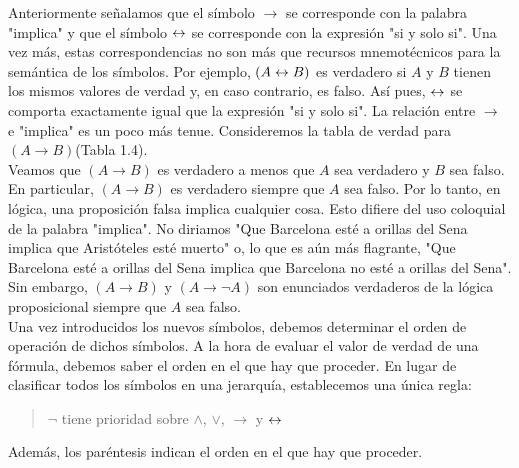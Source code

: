 \documentclass[12pt,a4paper]{book}
\newcommand{\comillas}[1]{"#1"}
\begin{document}
    Anteriormente señalamos que el símbolo $\rightarrow$ se corresponde con la palabra \comillas{implica} y que el símbolo $\leftrightarrow$ se corresponde con la
    expresión \comillas{si y solo si}. Una vez más, estas correspondencias no son más que recursos mnemotécnicos para la semántica de los símbolos.
    Por ejemplo, $(A\leftrightarrow B)$ es verdadero si $A$ y $B$ tienen los mismos valores de verdad y, en caso contrario, es falso. Así pues, $\leftrightarrow$ se comporta
    exactamente igual que la expresión \comillas{si y solo si}. La relación entre $\rightarrow$ e \comillas{implica} es un poco más tenue. Consideremos
    la tabla de verdad para $(A\rightarrow B)$(Tabla 1.4).\\
    Veamos que  $(A\rightarrow B)$ es verdadero a menos que $A$ sea verdadero y $B$ sea falso. En particular, $(A\rightarrow B)$ es verdadero siempre que $A$
    sea falso. Por lo tanto, en lógica, una proposición falsa implica cualquier cosa. Esto difiere del uso coloquial de la palabra \comillas{implica}. No
    diriamos \comillas{Que Barcelona esté a orillas del Sena implica que Aristóteles esté muerto} o, lo que es aún más flagrante, \comillas{Que Barcelona esté a orillas
    del Sena implica que Barcelona no esté a orillas del Sena}. Sin embargo, $(A\rightarrow B)$ y $(A\rightarrow\neg A)$ son enunciados verdaderos de la
    lógica proposicional siempre que $A$ sea falso.\\
    Una vez introducidos los nuevos símbolos, debemos determinar el orden de operación de dichos símbolos. A la hora de evaluar el valor de verdad de una fórmula,
    debemos saber el orden en el que hay que proceder. En lugar de clasificar todos los símbolos en una jerarquía, establecemos una única regla:

    \begin{quote}
        $\neg$ tiene prioridad sobre $\wedge$, $\vee$, $\rightarrow$ y $\leftrightarrow$
    \end{quote}

    Además, los paréntesis indican el orden en el que hay que proceder.
\end{document}
